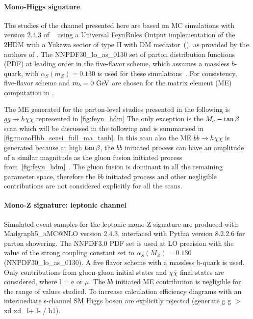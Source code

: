\paragraph{Mono-Higgs signature}

The studies of the \monohbb channel presented here are based on MC simulations with version 2.4.3 of \mg~\cite{Alwall:2014hca} using a Universal FeynRules Output \cite{Degrande:2011ua} implementation of the 2HDM with a Yukawa sector of type II with DM mediator~(\hdma), as provided by the authors of \cite{Bauer:2017ota}. 
The NNPDF30\_lo\_as\_0130 set of parton distribution functions (PDF) at leading order in the five-flavor scheme, which assumes a massless $b$-quark, with $\alpha_{S}(m_{Z}) = 0.130$ is used for these simulations~\cite{Ball:2014uwa}. For consistency, five-flavor scheme and $m_b=0~\textrm{GeV}$ are chosen for the matrix element (ME) computation in \mg.

The ME generated for the parton-level studies presented in the following is $ g g \to h  \chi \chi$ represented in  \autoref{fig:feyn_hdm}
The only exception is the $M_{a}-\tan\beta$ scan which will be discussed in the following and is summarised in \autoref{fig:monoHbb_sensi_full_ma_tanb}. In this scan also the ME $b b \to h  \chi \chi$ is generated because at high $\tan\beta$, the $b b$ initiated process can have an amplitude of a similar magnitude as the gluon fusion initiated process from~\autoref{fig:feyn_hdm}~\cite{Bauer:2017ota}. 
The gluon fusion is dominant in all the remaining parameter space, therefore the $bb$ initiated process and other negligible contributions are not considered explicitly for all the scans.

\paragraph{Mono-Z signature: leptonic channel}

Simulated event samples for the leptonic mono-Z signature are produced with Madgraph5\_aMC@NLO version 2.4.3, interfaced with Pythia version 8.2.2.6 for parton showering. The NNPDF3.0 PDF set is used at LO precision with the value of the strong coupling constant set to $\alpha_{S}(M_{Z}) = 0.130$ (NNPDF30\_lo\_as\_0130). A five flavor scheme with a massless b-quark is used.  Only contributions from gluon-gluon initial states and \lp\lm$\chi\overline{\chi}$ final states are considered, where l = e or $\mu$.  The $bb$ initiated ME contribution is negligible for the range of \tanb values studied.  To increase calculation efficiency diagrams with an intermediate s-channel SM Higgs boson are explicitly rejected (generate g g $>$ xd xd~ l+ l- / h1).

